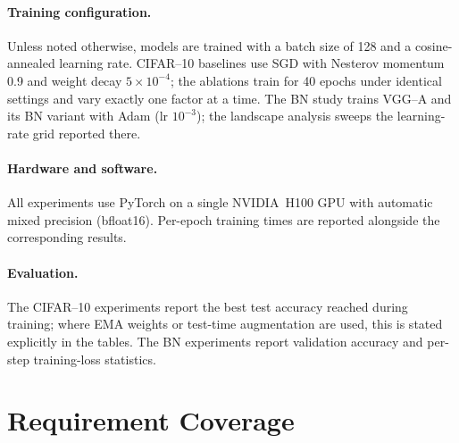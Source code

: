 \documentclass[11pt]{article}
\begin{document}
\paragraph{Training configuration.}
Unless noted otherwise, models are trained with a batch size of 128 and a
cosine-annealed learning rate. CIFAR--10 baselines use SGD with Nesterov
momentum 0.9 and weight decay $5\times10^{-4}$; the ablations train for 40
epochs under identical settings and vary exactly one factor at a time. The BN
study trains VGG--A and its BN variant with Adam (lr $10^{-3}$); the landscape
analysis sweeps the learning-rate grid reported there.

\paragraph{Hardware and software.}
All experiments use PyTorch on a single NVIDIA~H100 GPU with automatic mixed
precision (bfloat16). Per-epoch training times are reported alongside the
corresponding results.

\paragraph{Evaluation.}
The CIFAR--10 experiments report the best test accuracy reached during training;
where EMA weights or test-time augmentation are used, this is stated explicitly
in the tables.
The BN experiments report validation accuracy and per-step training-loss
statistics.

\section{Requirement Coverage}
\label{sec:coverage}
\end{document}
